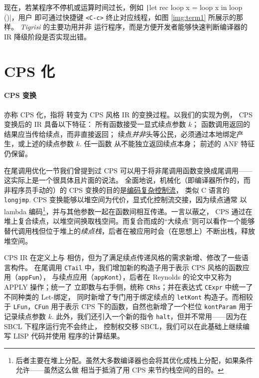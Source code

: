 现在，若某程序不停机或运算时间过长，例如 \texttt|let rec loop x = loop x in loop ()|，用户
即可通过快捷键 \texttt{<C-c>} 终止对应线程，如图 \ref{img:term1} 所展示的那样。
\emph{Tigrisi} 的主要功用并非
运行程序，而是方便开发者能够快速判断编译器的 IR 降级阶段是否实现出错。

\section{CPS 化}
\paragraph{CPS 变换} 亦称 CPS 化，指将 \Lambdair 转变为 CPS 风格 IR 的变换过程。以我们的实现为例，
CPS 变换后的 IR 具备以下特征：
所有函数接受一显式续点参数 $k$；
函数调用返回的结果应当传给续点，而非直接返回；
续点\emph{并非}头等公民，必须通过本地绑定产生，或上述的续点参数 $k$. 任一函数
从不能独立返回续点本身；
前述的 ANF 特征仍保留。

在尾调用优化一节我们曾提到过 CPS 可以用于将非尾调用函数变换成尾调用——这实际上是一个很具体且片面的说法。
全面地说，机械化（即编译器所作的，而非程序员手动的）的 CPS 变换的目的是\underline{编码复杂控制流}，
类似 C 语言的 \texttt{longjmp}. CPS 变换能够以堆空间为代价，显式化控制流交接，因为续点通常
以 lambda 编码\footnote{
  后者主要在堆上分配。虽然大多数编译器也会将其优化成栈上分配，如果条件允许——虽然这么做
  相当于抵消了用 CPS 来节约栈空间的目的。
}，并与其他参数一起在函数间相互传递。一言以蔽之，
CPS 通过在堆上复合续点，以堆空间换取栈空间。而复合而成的“大续点”则可以看作一个能够
替代调用栈但位于堆上的\emph{续点栈}，后者在被应用时会（在思想上）不断出栈，释放堆空间。

CPS IR 在定义上与 \Lambdair 相仿，但为了满足续点传递风格的需求新增、修改了一些语言构件。
在尾调用 \texttt{CTail} 中，我们增加新的构造子用于表示 CPS 风格的函数应用（\texttt{appFun}），
与续点应用（\texttt{appKont}），后者在 Reynolds 的论文中又称为 APPLY 操作；统一了
立即数与右手侧，统称 \texttt{CRhs}；并在表达式 \texttt{CExpr} 中统一了不同种类的 Let-绑定，
同时新增了专门用于绑定续点的 \texttt{letKont} 构造子。而相较于 \texttt{LFun}，\texttt{CFun}
用于表示 CPS 下的函数，自然也新增了一个栏位 \texttt{kontParam} 用于记录续点参数 $k$.
此外，我们还引入一个新的指令 \texttt{halt}，但并不常用——因为在 SBCL 下程序运行完不会终止，
控制权交移 SBCL，我们可以在此基础上继续编写 LISP 代码并使用 \Tigris 程序的计算结果。

